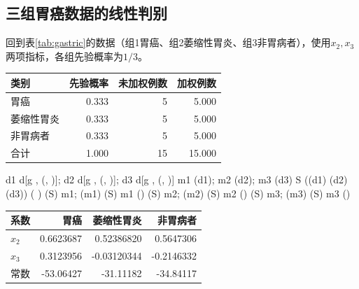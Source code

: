 \subsection{三组胃癌数据的线性判别}
回到表\ref{tab:gastric}的数据（组1胃癌、组2萎缩性胃炎、组3非胃病者），使用$x_2,x_3$两项指标，各组先验概率为$1/3$。
\begin{center}\begin{tabular}{lrrr}\toprule
{\bfseries 类别}&{\bfseries 先验概率}&{\bfseries 未加权例数}&{\bfseries 加权例数}\\\midrule
胃癌&0.333&5&5.000\\
萎缩性胃炎&0.333&5&5.000\\
非胃病者&0.333&5&5.000\\
合计&1.000&15&15.000\\\bottomrule
\end{tabular}\end{center}
\begin{code}
d1 \ROperator{<-} d[g \ROperator{==} , (, )]; d2 \ROperator{<-} d[g \ROperator{==} , (, )]; d3 \ROperator{<-} d[g \ROperator{==} , (, )]
m1 \ROperator{<-} (d1); m2 \ROperator{<-} (d2); m3 \ROperator{<-} (d3)
S \ROperator{<-} ((d1)\ROperator{*} \ROperator{+} (d2)\ROperator{*} \ROperator{+} (d3)\ROperator{*}) \ROperator{/} ( \ROperator{-} )   
(S) \ROperator{\%*\%} m1; \ROperator{-} \ROperator{*} (m1) \ROperator{\%*\%} (S) \ROperator{\%*\%} m1 \ROperator{+} (\ROperator{/})
(S) \ROperator{\%*\%} m2; \ROperator{-} \ROperator{*} (m2) \ROperator{\%*\%} (S) \ROperator{\%*\%} m2 \ROperator{+} (\ROperator{/})
(S) \ROperator{\%*\%} m3; \ROperator{-} \ROperator{*} (m3) \ROperator{\%*\%} (S) \ROperator{\%*\%} m3 \ROperator{+} (\ROperator{/})
\end{code}
\begin{center}\begin{tabular}{lrrr}\toprule
{\bfseries 系数}&{\bfseries 胃癌}&{\bfseries 萎缩性胃炎}&{\bfseries 非胃病者}\\\midrule
$x_2$&0.6623687&0.52386820&0.5647306\\
$x_3$&0.3123956&-0.03120344&-0.2146332\\
常数&-53.06427&-31.11182&-34.84117\\\bottomrule
\end{tabular}\end{center}
